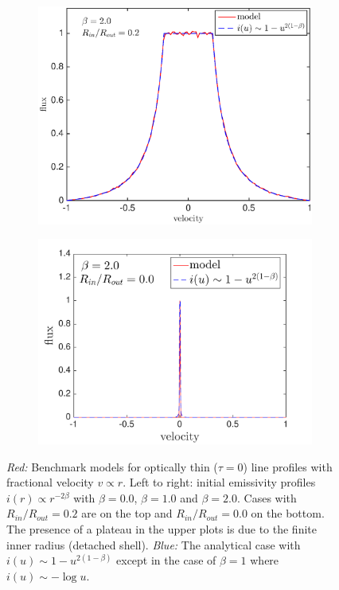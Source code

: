 \begin{figure}
\begin{subfigure}{0.5\textwidth}
\centering
\includegraphics[trim =25 25 45 15,clip=true,scale=0.46]{chapters/chapter4/images/params/A/b2_r0_2}
\end{subfigure}
\hspace{4mm}
\begin{subfigure}{0.5\textwidth}
\centering
\includegraphics[trim =72 25 45 15,clip=true,scale=0.46]{chapters/chapter4/images/params/A/b2_r0}
\end{subfigure}

\caption{\textit{Red:} Benchmark models for optically thin ($\tau =0$) 
line profiles  with fractional velocity $v \propto r$. Left to right: initial emissivity 
profiles $i(r) \propto r^{-2\beta}$ with $\beta=0.0$, $\beta=1.0$ and 
$\beta=2.0$. Cases with $R_{in}/R_{out}=0.2$ are on the top and 
$R_{in}/R_{out}=0.0$ on the bottom.  The presence of a plateau in the upper plots is due to the finite inner radius (detached shell). \textit{Blue:} The analytical case 
with $i(u) \sim 1-u^{2(1-\beta)}$ except in the case of $\beta=1$ where 
$i(u) \sim -\log u$.}
\label{fig:analytics}
\end{figure}

